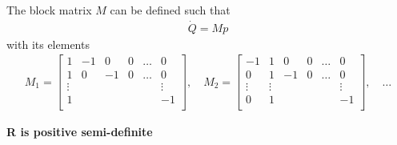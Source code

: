 The block matrix $M$ can be defined such that 
\begin{equation}
\begin{aligned}
    \dot Q = Mp
\end{aligned}
\label{eq:Qmp}   
\end{equation}
with its elements
\begin{gather}
    M_1 = 
    \begin{bmatrix}
        1 & -1 & 0 & 0 & \dots & 0 \\
        1 & 0 & -1 & 0 & \dots & 0 \\
        \vdots & & &  &  & \vdots \\
        1 & & & &  & -1 \\
    \end{bmatrix}, \quad
    M_2 = 
    \begin{bmatrix}
        -1 & 1 & 0 & 0 & \dots & 0 \\
        0 & 1 & -1 & 0 & \dots & 0 \\
        \vdots & \vdots & &  &  & \vdots \\
        0 & 1& & &  & -1 \\
    \end{bmatrix}, \quad \dots
    \label{eq:M_n_def}
\end{gather}
 
\hrulefill

\textbf{R is positive semi-definite}

